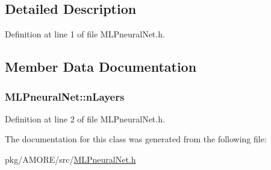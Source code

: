 \subsection{Detailed Description}


Definition at line 1 of file MLPneuralNet.h.



\subsection{Member Data Documentation}
\hypertarget{class_m_l_pneural_net_a47ac9b8f98813bf63598c78ad444d6db}{
\subsubsection[{nLayers}]{ {\bf MLPneuralNet::nLayers}}}
\label{class_m_l_pneural_net_a47ac9b8f98813bf63598c78ad444d6db}


Definition at line 2 of file MLPneuralNet.h.



The documentation for this class was generated from the following file:\begin{DoxyCompactItemize}
\item 
pkg/AMORE/src/\hyperlink{_m_l_pneural_net_8h}{MLPneuralNet.h}\end{DoxyCompactItemize}
